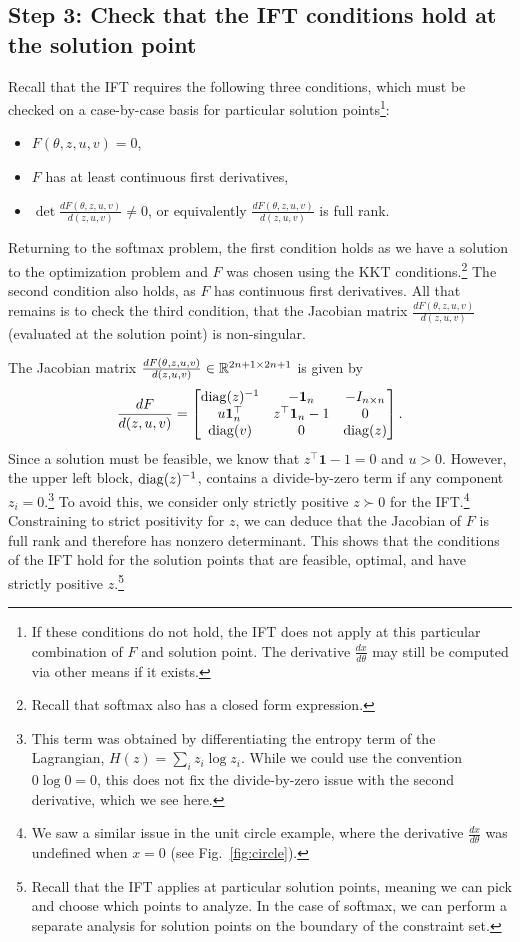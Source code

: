 \documentclass[11pt]{article}
\begin{document}
\subsection*{Step 3: Check that the IFT conditions hold at the solution point}
Recall that the IFT requires the following three conditions,
which must be checked on a case-by-case basis for particular
solution points\footnote{If these conditions do not hold,
the IFT does not apply at this particular combination of $F$ and solution point.
The derivative $\frac{dx}{d\theta}$ may still be computed via other means
if it exists.}:
\begin{itemize}
    \item $F(\theta,z,u,v) = 0$,
    \item $F$ has at least continuous first derivatives,
    \item $\det\frac{dF(\theta,z,u,v)}{d(z,u,v)} \ne 0$,
        or equivalently $\frac{dF(\theta,z,u,v)}{d(z,u,v)}$
        is full rank.
\end{itemize}
Returning to the softmax problem,
the first condition holds as we have a solution to the optimization problem
and $F$ was chosen using the KKT conditions.\footnote{
Recall that softmax also has a closed form expression.}
The second condition also holds, as $F$ has continuous first derivatives.
All that remains is to check the third condition,
that the Jacobian matrix $\frac{dF(\theta,z,u,v)}{d(z,u,v)}$
(evaluated at the solution point) is non-singular.

The Jacobian matrix $\frac{dF(\theta,z,u,v)}{d(z,u,v)}\in\mathbb{R}^{2n+1\times 2n+1}$ is given by
\begin{equation}
\label{eqn:f-jac}
\frac{dF}{d(z,u,v)}=
\begin{bmatrix}
\mathrm{diag}(z)^{-1} & -\mathbf{1}_n & -I_{n\times n} \\
u\mathbf{1}_n^\top & z^\top\mathbf{1}_n - 1 & 0\\
\mathrm{diag}(v) & 0 & \mathrm{diag}(z)
\end{bmatrix}.
\end{equation}
Since a solution must be feasible, we know that $z^\top\mathbf{1}-1=0$ and $u > 0$.
However, the upper left block, $\mathrm{diag}(z)^{-1}$, contains a divide-by-zero term if
any component $z_i = 0$.\footnote{
This term was obtained by differentiating the entropy
term of the Lagrangian, $H(z) = \sum_i z_i\log z_i$.
While we could use the convention $0\log 0 = 0$,
this does not fix the divide-by-zero issue with the second derivative, which we see here.
}
To avoid this, we consider only strictly positive $z \succ 0$ for the IFT.\footnote{
We saw a similar issue in the unit circle example, where the derivative
$\frac{dx}{d\theta}$ was undefined when $x=0$ (see Fig.~\ref{fig:circle}).
}
Constraining to strict positivity for $z$,
we can deduce that the Jacobian of $F$ is full rank and therefore has nonzero determinant.
This shows that the conditions of the IFT hold for the solution points that are
feasible, optimal, and have strictly positive $z$.\footnote{
Recall that the IFT applies at particular solution points,
meaning we can pick and choose which points to analyze.
In the case of softmax, we can perform a separate analysis
for solution points on the boundary of the constraint set.
}
\end{document}
